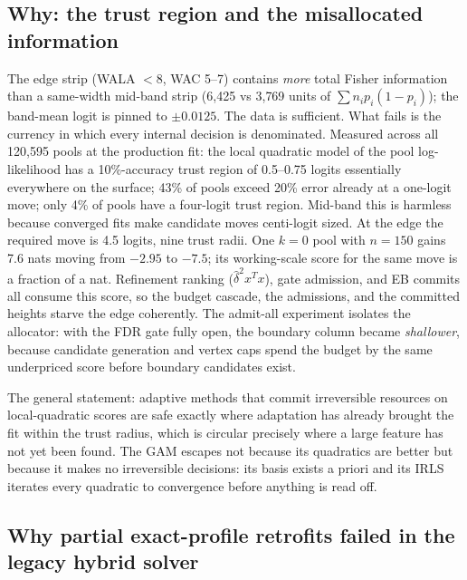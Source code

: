\documentclass[11pt]{article}
\begin{document}
\subsection{Why: the trust region and the misallocated information}

The edge strip (WALA $<8$, WAC 5--7) contains \emph{more} total Fisher
information than a same-width mid-band strip (6{,}425 vs 3{,}769 units
of $\sum n_i p_i(1-p_i)$); the band-mean logit is pinned to
$\pm 0.0125$. The data is sufficient. What fails is the currency in
which every internal decision is denominated. Measured across all
120{,}595 pools at the production fit: the local quadratic model of
the pool log-likelihood has a 10\%-accuracy trust region of 0.5--0.75
logits essentially everywhere on the surface; 43\% of pools exceed
20\% error already at a one-logit move; only 4\% of pools have a
four-logit trust region. Mid-band this is harmless because converged
fits make candidate moves centi-logit sized. At the edge the required
move is 4.5 logits, nine trust radii. One $k=0$ pool with $n=150$
gains 7.6 nats moving from $-2.95$ to $-7.5$; its working-scale score
for the same move is a fraction of a nat. Refinement ranking
($\hat\delta^2 x^Tx$), gate admission, and EB commits all consume this
score, so the budget cascade, the admissions, and the committed
heights starve the edge coherently. The admit-all experiment isolates
the allocator: with the FDR gate fully open, the boundary column
became \emph{shallower}, because candidate generation and vertex caps
spend the budget by the same underpriced score before boundary
candidates exist.

The general statement: adaptive methods that commit irreversible
resources on local-quadratic scores are safe exactly where adaptation
has already brought the fit within the trust radius, which is circular
precisely where a large feature has not yet been found. The GAM
escapes not because its quadratics are better but because it makes no
irreversible decisions: its basis exists a priori and its IRLS
iterates every quadratic to convergence before anything is read off.

\subsection{Why partial exact-profile retrofits failed in the legacy hybrid solver}
\end{document}
